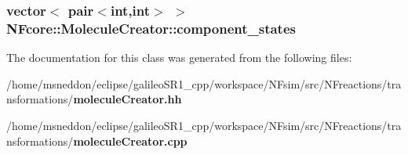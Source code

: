 \subsubsection{\setlength{\rightskip}{0pt plus 5cm}vector$<$ pair$<$int,int$>$ $>$ {\bf NFcore::MoleculeCreator::component\_\-states}\hspace{0.3cm}{\tt  [protected]}}\label{classNFcore_1_1MoleculeCreator_cfb2469a83e222db950c819054f1c7ae}




The documentation for this class was generated from the following files:\begin{CompactItemize}
\item 
/home/msneddon/eclipse/galileoSR1\_\-cpp/workspace/NFsim/src/NFreactions/transformations/{\bf moleculeCreator.hh}\item 
/home/msneddon/eclipse/galileoSR1\_\-cpp/workspace/NFsim/src/NFreactions/transformations/{\bf moleculeCreator.cpp}\end{CompactItemize}
